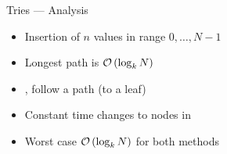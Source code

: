 \begin{frame}{Tries --- Analysis}
	\begin{itemize}[<+->]
		\itemspacing{20pt}
		\item Insertion of $n$ values in range $0, \ldots, N - 1$
		\item Longest path is $\mathcal{O}\left(\log_k N\right)$
		\item {},  follow a path (to a leaf)
		\item Constant time changes to nodes in 
		\item Worst case $\mathcal{O}\left(\log_k N\right)$ for both methods
	\end{itemize}
\end{frame}